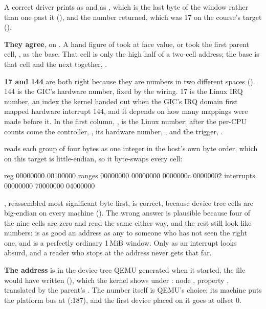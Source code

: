  A correct driver prints  as  and  as
, which is the last byte of the window rather than one past it
(), and the number  returned, which was 17 on the
course's target ().

 \textbf{They agree}, on . A hand figure of  took  at
face value, or took the first parent cell, , as the base. That cell is only the
high half of a two-cell address; the base is that cell and the next together,
.

\textbf{17 and 144} are both right because they are numbers in two different spaces
(). 144 is the GIC's hardware number, fixed by the wiring. 17 is the Linux IRQ
number, an index the kernel handed out when the GIC's IRQ domain first mapped hardware interrupt
144, and it depends on how many mappings were made before it. In  the first
column, , is the Linux number; after the per-CPU counts come the controller,
, its hardware number, , and the trigger, .

\textbf{} reads each group of four bytes as one integer in the host's own byte order,
which on this target is little-endian, so it byte-swaps every cell:

\begin{console}
reg         00000000 00100000
ranges      00000000 00000000 0000000c 00000002
interrupts  00000000 70000000 04000000
\end{console}

\noindent {}, reassembled most significant byte first, is correct, because device tree
cells are big-endian on every machine (). The wrong answer is plausible because
four of the nine cells are zero and read the same either way, and the rest still look like numbers:
 is as good an address as any to someone who has not seen the right one, and
 is a perfectly ordinary 1\,MiB window. Only  as an interrupt looks
absurd, and a reader who stops at the address never gets that far.

 \textbf{The address} is in the device tree QEMU generated when it started, the file
 would have written (), which the kernel shows under
: node , property
, translated by the parent's . The number itself is QEMU's choice: its
 machine puts the platform bus at  (:187), and the
first device placed on it goes at offset 0.


